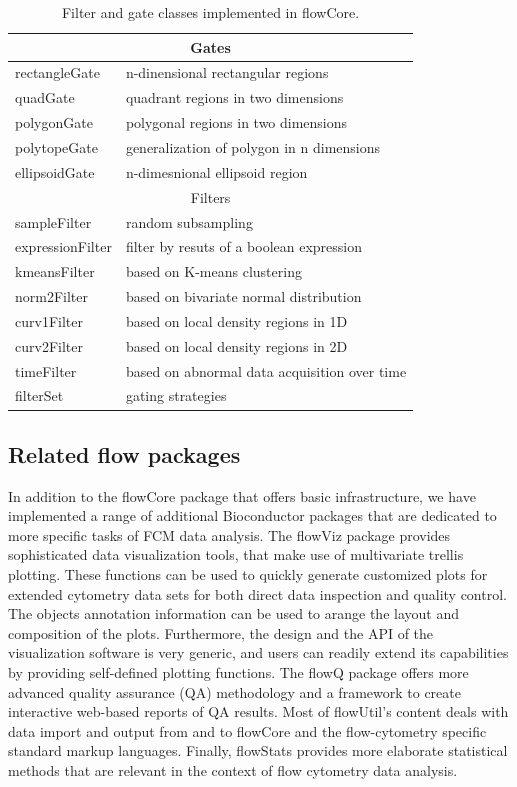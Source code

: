 \documentclass[12pt]{article}
\begin{document}
\begin{table}[ht]
\begin{center}
\begin{tabular}{|l|l|}
\hline
\multicolumn{2}{|c|}{Gates} \\
\hline
rectangleGate & n-dinensional rectangular regions \\
quadGate & quadrant regions in two dimensions \\
polygonGate & polygonal regions in two dimensions \\
polytopeGate & generalization of polygon in n dimensions \\
ellipsoidGate & n-dimesnional ellipsoid region \\
\hline
\multicolumn{2}{|c|}{Filters} \\
\hline
sampleFilter & random subsampling\\
expressionFilter & filter by resuts of a boolean expression \\
kmeansFilter & based on K-means clustering \\
norm2Filter & based on bivariate normal distribution \\
curv1Filter & based on local density regions in 1D \\
curv2Filter & based on local density regions in 2D \\
timeFilter & based on abnormal data acquisition over time \\
\hline
filterSet & gating strategies \\
\hline
\end{tabular}
\caption{\label{table2}Filter and gate classes implemented in flowCore.}
\end{center}
\end{table}

\subsection*{Related flow packages}
In addition to the flowCore package that offers basic infrastructure,
we have implemented a range of additional Bioconductor packages that
are dedicated to more specific tasks of FCM data analysis. The flowViz
package \citep{sarkar2008ufv} provides sophisticated data
visualization tools, that make use of multivariate trellis
plotting. These functions can be used to quickly generate customized
plots for extended cytometry data sets for both direct data inspection
and quality control. The objects annotation information can be used to
arange the layout and composition of the plots. Furthermore, the
design and the API of the visualization software is very generic, and
users can readily extend its capabilities by providing self-defined
plotting functions.  The flowQ package offers more advanced quality
assurance (QA) methodology and a framework to create interactive
web-based reports of QA results. Most of flowUtil's content deals with
data import and output from and to flowCore and the flow-cytometry
specific standard markup languages. Finally, flowStats provides more
elaborate statistical methods that are relevant in the context of flow
cytometry data analysis.
\end{document}
